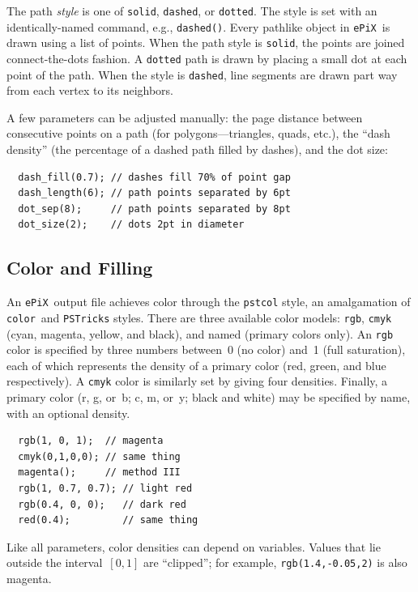 \documentclass[12pt]{report}
\newcommand{\code}[1]{\texttt{#1}}
\newcommand{\ePiX}{\code{ePiX}}
\begin{document}
The path \emph{style} is one of \code{solid}, \code{dashed}, or
\code{dotted}. The style is set with an identically-named command,
e.g., \code{dashed()}.  Every pathlike object in \ePiX\ is drawn using
a list of points. When the path style is \code{solid}, the points are
joined connect-the-dots fashion. A \code{dotted} path is drawn by
placing a small dot at each point of the path. When the style is
\code{dashed}, line segments are drawn part way from each vertex to its
neighbors.
\begin{center}
  
\end{center}
A few parameters can be adjusted manually: the page distance between
consecutive points on a path (for polygons---triangles, quads, etc.),
the ``dash density'' (the percentage of a dashed path filled by
dashes), and the dot size:
\begin{verbatim}
  dash_fill(0.7); // dashes fill 70% of point gap
  dash_length(6); // path points separated by 6pt
  dot_sep(8);     // path points separated by 8pt
  dot_size(2);    // dots 2pt in diameter
\end{verbatim}


\subsection*{Color and Filling}

An \ePiX\ output file achieves color through the \code{pstcol} style,
an amalgamation of \code{color}~and \code{PSTricks} styles. There are
three available color models: \code{rgb}, \code{cmyk} (cyan, magenta,
yellow, and black), and named (primary colors only). An \code{rgb}
color is specified by three numbers between~0 (no color) and~1 (full
saturation), each of which represents the density of a primary color
(red, green, and blue respectively). A \code{cmyk} color is similarly
set by giving four densities. Finally, a primary color (r, g, or~b; c,
m, or~y; black and white) may be specified by name, with an optional
density.
\begin{verbatim}
  rgb(1, 0, 1);  // magenta
  cmyk(0,1,0,0); // same thing
  magenta();     // method III
  rgb(1, 0.7, 0.7); // light red
  rgb(0.4, 0, 0);   // dark red
  red(0.4);         // same thing
\end{verbatim}
Like all parameters, color densities can depend on variables. Values
that lie outside the interval~$[0,1]$ are ``clipped''; for example,
\code{rgb(1.4,-0.05,2)} is also magenta.
\end{document}

